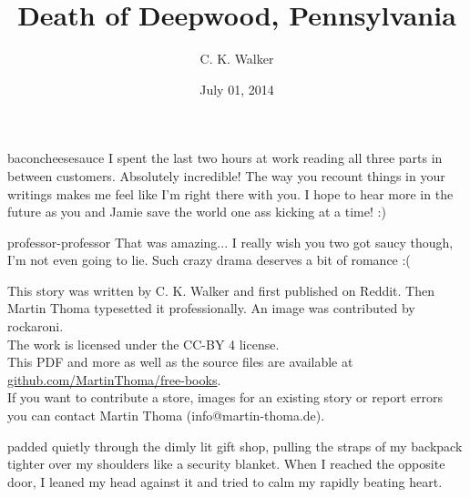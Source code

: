 \documentclass[a5paper]{scrartcl}
\title{Death of Deepwood, Pennsylvania}
\author{C. K. Walker}
\date{July 01, 2014}
\begin{document}
\maketitle

\begin{shadequote}[l]{baconcheesesauce}
I spent the last two hours at work reading all three parts in between customers. Absolutely incredible! The way you recount things in your writings makes me feel like I'm right there with you. I hope to hear more in the future as you and Jamie save the world one ass kicking at a time! :)
\end{shadequote}

\begin{shadequote}[l]{professor-professor}
That was amazing... I really wish you two got saucy though, I'm not even going to lie. Such crazy drama deserves a bit of romance :(
\end{shadequote}


\clearpage

This story was written by C. K. Walker and first published on Reddit. Then
Martin Thoma typesetted it professionally. An image was contributed by rockaroni.\\

The work is licensed under the CC-BY 4 license.\\

This PDF and more as well as the source files are available at
\url{github.com/MartinThoma/free-books}.\\

If you want to contribute a store, images for an existing story or report
errors you can contact Martin Thoma (info@martin-thoma.de).

\clearpage



 padded quietly through the dimly lit gift shop, pulling the straps of my backpack tighter over my shoulders like a security blanket. When I reached the opposite door, I leaned my head against it and tried to calm my rapidly beating heart. \\
\end{document}

